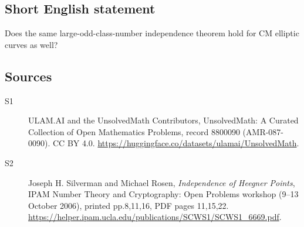\documentclass[11pt]{article}
\begin{document}
\subsection{Short English statement}
Does the same large-odd-class-number independence theorem hold for CM elliptic curves as well?
\subsection{Sources}
\begin{description}
\item[\hypertarget{source:8800090:1}{S1}] ULAM.AI and the UnsolvedMath Contributors, UnsolvedMath: A Curated Collection of Open Mathematics Problems, record 8800090 (AMR-087-0090). CC BY 4.0. \url{https://huggingface.co/datasets/ulamai/UnsolvedMath}.
\item[\hypertarget{source:8800090:2}{S2}] Joseph H. Silverman and Michael Rosen, \emph{Independence of Heegner Points}, IPAM Number Theory and Cryptography: Open Problems workshop (9--13 October 2006), printed pp.8,11,16, PDF pages 11,15,22. \url{https://helper.ipam.ucla.edu/publications/SCWS1/SCWS1_6669.pdf}.
\end{description}
\label{end:8800090}
\end{document}
